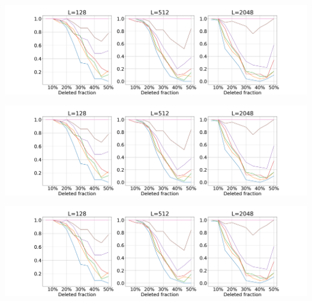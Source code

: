\documentclass[25pt,a0paper]{tikzposter}
\begin{document}
\begin{columns}
{\begin{center}
\begin{minipage}{.25\linewidth}
\centering
\begin{tikzfigure}[]
  \includegraphics[width=\linewidth, trim={18.63cm 0 123.15cm 0},clip]{figures/probaCVFourier.png}
\end{tikzfigure}
\end{minipage}
\hspace{2cm}
\begin{minipage}{.25\linewidth}
\centering
\begin{tikzfigure}[]
  \includegraphics[width=\linewidth, trim={70.70cm 0 71.05cm 0},clip]{figures/probaCVFourier.png}
\end{tikzfigure}
\end{minipage}
\hspace{2cm}
\begin{minipage}{.25\linewidth}
\centering
\begin{tikzfigure}[]
  \includegraphics[width=\linewidth, trim={122.84cm 0 18.98cm 0},clip]{figures/probaCVFourier.png}
\end{tikzfigure}
\end{minipage}
\end{center}
\vspace{.2cm}
}
\end{columns}
\end{document}
